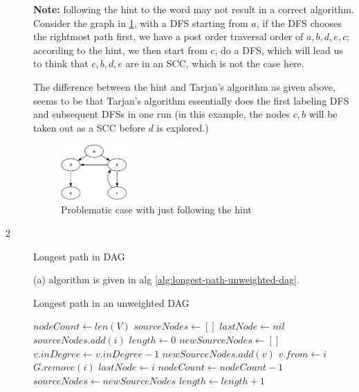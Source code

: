 \documentclass{article}
\begin{document}
\begin{description}
  \textbf{Note:} following the hint to the word may not result in a correct algorithm. Consider the graph in \ref{fig:pb1}, with a DFS starting from $a$, if the DFS chooses the rightmost path first, we have a post order traversal order of $a, b, d, e, c$; according to the hint, we then start from $c$, do a DFS, which will lead us to think that $c, b, d, e$ are in an SCC, which is not the case here. 

  The difference between the hint and Tarjan's algorithm as given above, seems to be that Tarjan's algorithm essentially does the first labeling DFS and subsequent DFSs in one run (in this example, the nodes $c, b$ will be taken out as a SCC before $d$ is explored.)

  \begin{figure}[h]
  \centering
  \includegraphics[width=0.25\textwidth]{hw31case}
  \caption{Problematic case with just following the hint}
  \label{fig:pb1}
  \end{figure}

\item[2]{Longest path in DAG}

  (a) algorithm is given in alg \ref{alg:longest-path-unweighted-dag}.

  \begin{algorithm}[h]
  \caption{Longest path in an unweighted DAG}
  \label{alg:longest-path-unweighted-dag}
    \begin{algorithmic}[1]
  
      \State $nodeCount \gets len(V)$
      \State $sourceNodes \gets []$
      \State $lastNode \gets nil$
          \State $sourceNodes.add(i)$
        \EndIf
      \EndFor
      \State $length \gets 0$
        \State $newSourceNodes \gets []$
            \State $v.inDegree \gets v.inDegree - 1$
              \State $newSourceNodes.add(v)$
              \State $v.from \gets i$
            \EndIf
          \EndFor
          \State $G.remove(i)$
          \State $lastNode \gets i$
          \State $nodeCount \gets nodeCount - 1$
        \EndFor
        \State $sourceNodes \gets newSourceNodes$
        \State $length \gets length + 1$
      \EndWhile


\end{algorithmic}
\end{algorithm}
\end{description}
\end{document}
